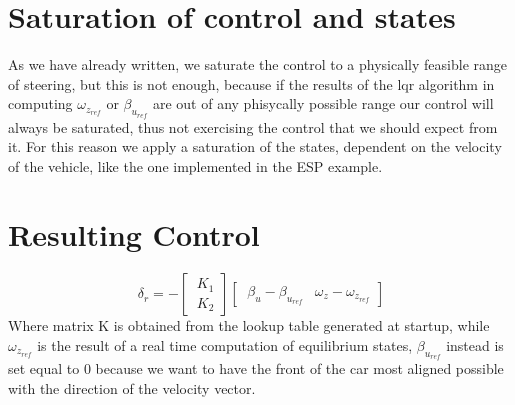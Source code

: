 \section{Saturation of control and states}
As we have already written, we saturate the control to a physically feasible range of steering, but this is not enough, because if the results of the lqr algorithm in computing $\omega_{z_{ref}}$ or $\beta_{u_{ref}}$ are out of any phisycally possible range our control will always be saturated, thus not exercising the control that we should expect from it. For this reason we apply a saturation of the states, dependent on the velocity of the vehicle, like the one implemented in the ESP example.
\section{Resulting Control}
\begin{equation} \label{Resulting Control}
	\ \delta_{r} = -
	\begin{bmatrix}
	\ K_{1}\\
	\ K_{2}
	\end{bmatrix}
	\begin{bmatrix}
	\ \beta_{u}-\beta_{u_{ref}} & \omega_{z}-\omega_{z_{ref}}
	\end{bmatrix}
\end{equation}
Where matrix K is obtained from the lookup table generated at startup, while $\omega_{z_{ref}}$ is the result of a real time computation of equilibrium states, $\beta_{u_{ref}}$ instead is set equal to 0 because we want to have the front of the car most aligned possible with the direction of the velocity vector.
